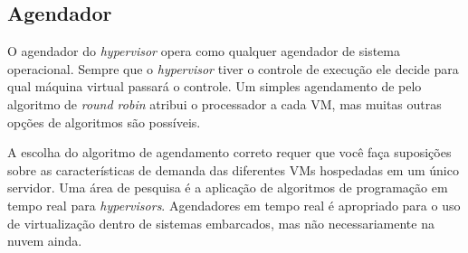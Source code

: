 	\subsection{Agendador}
	O agendador do \textit{hypervisor} opera como qualquer agendador de sistema operacional. Sempre que o \textit{hypervisor} tiver o controle de execução ele decide para qual máquina virtual passará o controle. Um simples agendamento de pelo algoritmo de \textit{round robin} atribui o processador a cada VM, mas muitas outras opções de algoritmos são possíveis. 

	A escolha do algoritmo de agendamento correto requer que você faça suposições sobre as características de demanda das diferentes VMs hospedadas em um único servidor. Uma área de pesquisa é a aplicação de algoritmos de programação em tempo real para \textit{hypervisors}. Agendadores em tempo real é apropriado para o uso de virtualização dentro de sistemas embarcados, mas não necessariamente na nuvem ainda.


\iffalse
	
	\section{Hadoop Distributed File System}
	

\fi